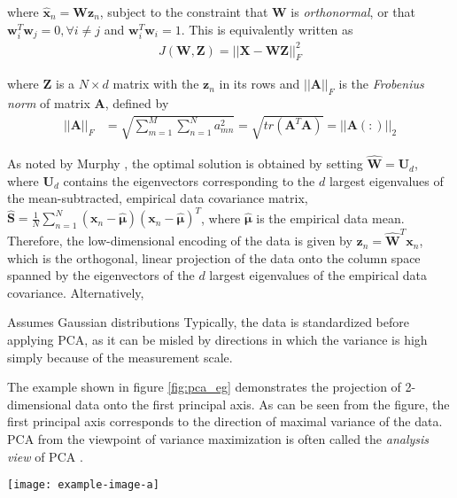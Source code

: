 \noindent
where $\hat{\bm{x}}_n = \bm{W}\bm{z}_{n}$, subject to the constraint that $\bm{W}$ is \textit{orthonormal}, or that $\bm{w}_{i}^{T}\bm{w}_{j}=0,\forall i \neq j$ and $\bm{w}_{i}^{T}\bm{w}_{i}=1 $.  This is equivalently written as 
\begin{align}
		J(\bm{W}, \bm{Z}) = ||\bm{X} - \bm{W}\bm{Z} ||^{2}_{F}
\end{align}

\noindent
where $\bm{Z}$ is a $N \times d$ matrix with the $\bm{z}_{n}$ in its rows and $||\bm{A}||_{F}$ is the \textit{Frobenius norm} of matrix $\bm{A}$, defined by 
\begin{align}
	||\bm{A}||_{F} &= \sqrt{\sum_{m=1}^{M}\sum_{n=1}^{N}a^{2}_{mn}} = \sqrt{tr(\bm{A}^{T}\bm{A})} = ||\bm{A}(:)||_{2}
\end{align} 

\noindent
As noted by Murphy \citep{Murphy2012}, the optimal solution is obtained by setting $\hat{\bm{W}} = \bm{U}_{d}$, where $\bm{U}_{d}$ contains the eigenvectors corresponding to the $d$ largest eigenvalues of the mean-subtracted, empirical data covariance matrix, $\hat{\bm{S}} = \frac{1}{N}\sum_{n=1}^{N}(\bm{x}_{n}-\hat{\bm{\mu}})(\bm{x}_{n}-\hat{\bm{\mu}})^{T}$, where $\hat{\bm{\mu}}$ is the empirical data mean.  Therefore, the low-dimensional encoding of the data is given by $\bm{z}_n = \hat{\bm{W}}^{T}\bm{x}_n$, which is the orthogonal, linear projection of the data onto the column space spanned by the eigenvectors of the $d$ largest eigenvalues of the empirical data covariance.  Alternatively, 


Assumes Gaussian distributions
Typically, the data is standardized before applying PCA, as it can be misled by directions in which the variance is high simply because of the measurement scale.

The example shown in figure \ref{fig:pca_eg} demonstrates the projection of 2-dimensional data onto the first principal axis.  As can be seen from the figure, the first principal axis corresponds to the direction of maximal variance of the data.  PCA from the viewpoint of variance maximization is often called the \textit{analysis view} of PCA \citep{Murphy2012}.

\begin{center}
	\begin{figure*}[h]
		\centering
		\texttt{[image: example-image-a]}
		\caption[PCA Example.]{Placeholder for PCA projection example.}
		\label{fig:pca_eg}
	\end{figure*}
\end{center}


